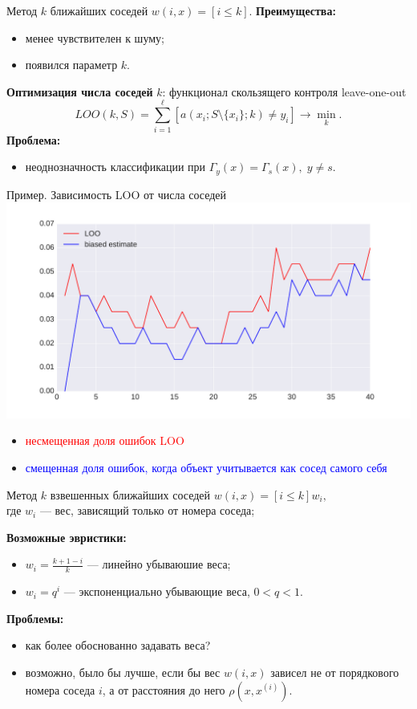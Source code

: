 \documentclass{beamer}
\begin{document}
\begin{frame}{Метод $k$ ближайших соседей}
$w(i, x) = [i \le k]$.
\vfill
{\bf Преимущества:}
\begin{itemize}
    \item менее чувствителен к шуму;
    \item появился параметр $k$.
\end{itemize}
{\bf Оптимизация числа соседей} $k$:
функционал скользящего контроля leave-one-out
$$
LOO(k, S) = \sum\limits_{i=1}^{\ell}\left[a(x_i; S\setminus\{x_i\}; k) \ne y_i\right] \rightarrow \min_k.
$$
{\bf Проблема:}
\begin{itemize}
    \item неоднозначность классификации при $\Gamma_y(x) = \Gamma_s(x),\; y \ne s$.
\end{itemize}
\end{frame}

\begin{frame}{Пример. Зависимость LOO от числа соседей}
\includegraphics[width=\linewidth]{../fig/iris_knn_loo.pdf}
\begin{itemize}
    \item \textcolor{red}{несмещенная доля ошибок LOO}
    \item \textcolor{blue}{смещенная доля ошибок, когда объект учитывается как сосед самого себя}
\end{itemize}
\end{frame}

\begin{frame}{Метод $k$ взвешенных ближайших соседей}
$w(i,x) = [i \le k] w_i,$\\
где $w_i$ --- вес, зависящий только от номера соседа;

{\bf Возможные эвристики:}
\begin{itemize}
    \item $w_i = \frac{k+1-i}{k}$ --- линейно убываюшие веса;
    \item $w_i = q^i$ --- экспоненциально убывающие веса, $0 < q < 1$.
\end{itemize}
{\bf Проблемы:}
\begin{itemize}
    \item как более обоснованно задавать веса?
    \item возможно, было бы лучше, если бы вес $w(i,x)$ зависел не от порядкового номера соседа $i$, а от расстояния до него $\rho(x, x^{(i)})$.
\end{itemize}
\end{frame}
\end{document}
